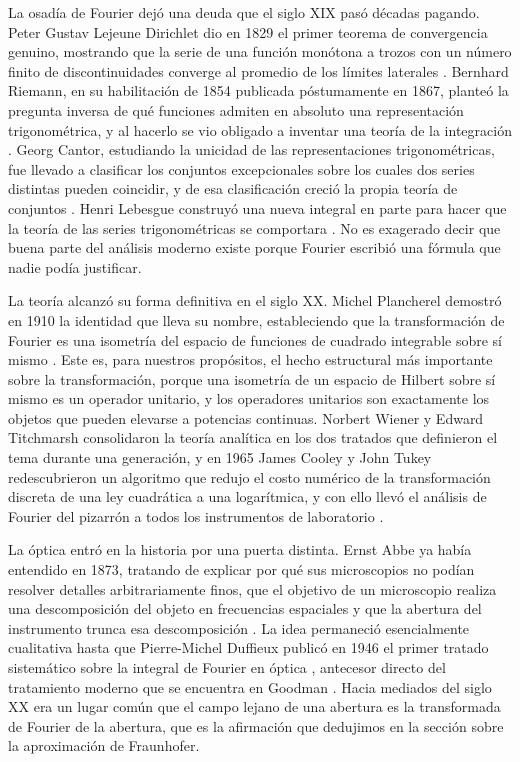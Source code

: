 		La osadía de Fourier dejó una deuda que el siglo XIX pasó décadas pagando. Peter Gustav Lejeune Dirichlet dio en 1829 el primer teorema de convergencia genuino, mostrando que la serie de una función monótona a trozos con un número finito de discontinuidades converge al promedio de los límites laterales \citep{dirichlet1829convergence}. Bernhard Riemann, en su habilitación de 1854 publicada póstumamente en 1867, planteó la pregunta inversa de qué funciones admiten en absoluto una representación trigonométrica, y al hacerlo se vio obligado a inventar una teoría de la integración \citep{riemann1867darstellbarkeit}. Georg Cantor, estudiando la unicidad de las representaciones trigonométricas, fue llevado a clasificar los conjuntos excepcionales sobre los cuales dos series distintas pueden coincidir, y de esa clasificación creció la propia teoría de conjuntos \citep{cantor1872ausdehnung}. Henri Lebesgue construyó una nueva integral en parte para hacer que la teoría de las series trigonométricas se comportara \citep{lebesgue1903series}. No es exagerado decir que buena parte del análisis moderno existe porque Fourier escribió una fórmula que nadie podía justificar.

		La teoría alcanzó su forma definitiva en el siglo XX. Michel Plancherel demostró en 1910 la identidad que lleva su nombre, estableciendo que la transformación de Fourier es una isometría del espacio de funciones de cuadrado integrable sobre sí mismo \citep{plancherel1910contribution}. Este es, para nuestros propósitos, el hecho estructural más importante sobre la transformación, porque una isometría de un espacio de Hilbert sobre sí mismo es un operador unitario, y los operadores unitarios son exactamente los objetos que pueden elevarse a potencias continuas. Norbert Wiener \citeyearpar{wiener1933fourier} y Edward Titchmarsh \citeyearpar{titchmarsh1937introduction} consolidaron la teoría analítica en los dos tratados que definieron el tema durante una generación, y en 1965 James Cooley y John Tukey redescubrieron un algoritmo que redujo el costo numérico de la transformación discreta de una ley cuadrática a una logarítmica, y con ello llevó el análisis de Fourier del pizarrón a todos los instrumentos de laboratorio \citep{cooley1965algorithm}.

		La óptica entró en la historia por una puerta distinta. Ernst Abbe ya había entendido en 1873, tratando de explicar por qué sus microscopios no podían resolver detalles arbitrariamente finos, que el objetivo de un microscopio realiza una descomposición del objeto en frecuencias espaciales y que la abertura del instrumento trunca esa descomposición \citep{abbe1873beitrage}. La idea permaneció esencialmente cualitativa hasta que Pierre-Michel Duffieux publicó en 1946 el primer tratado sistemático sobre la integral de Fourier en óptica \citep{duffieux1946integrale}, antecesor directo del tratamiento moderno que se encuentra en Goodman \citeyearpar{goodman2005introduction}. Hacia mediados del siglo XX era un lugar común que el campo lejano de una abertura es la transformada de Fourier de la abertura, que es la afirmación que dedujimos en la sección sobre la aproximación de Fraunhofer.

